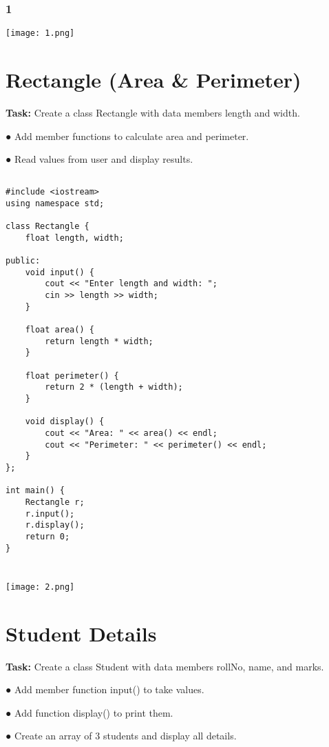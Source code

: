 \documentclass[12pt,a4paper]{article}
\begin{document}
\subsubsection{1}
\begin{center}
    \texttt{[image: 1.png]}
\end{center}



\section{Rectangle (Area & Perimeter)}
\textbf{Task:} Create a class Rectangle with data members length and width.
    \item ● Add member functions to calculate area and perimeter.
    \item ● Read values from user and display results.
\subsection{}
\begin{lstlisting}
#include <iostream>
using namespace std;

class Rectangle {
    float length, width;

public:
    void input() {
        cout << "Enter length and width: ";
        cin >> length >> width;
    }

    float area() {
        return length * width;
    }

    float perimeter() {
        return 2 * (length + width);
    }

    void display() {
        cout << "Area: " << area() << endl;
        cout << "Perimeter: " << perimeter() << endl;
    }
};

int main() {
    Rectangle r;
    r.input();
    r.display();
    return 0;
}


\end{lstlisting}

\subsubsection{}
\begin{center}
    \texttt{[image: 2.png]}
\end{center}


\section{Student Details}
\textbf{Task:} Create a class Student with data members rollNo, name, and marks.
    \item ● Add member function input() to take values.
    \item ● Add function display() to print them.
    \item ● Create an array of 3 students and display all details. 
\end{document}
